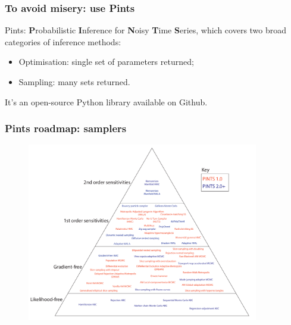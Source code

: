 \documentclass[handout]{beamer}
\begin{document}
\begin{frame}
\frametitle{To avoid misery: use Pints}

Pints: \textbf{P}robabilistic \textbf{I}nference for \textbf{N}oisy \textbf{T}ime \textbf{S}eries, which covers two broad categories of inference methods:

\begin{itemize}
	\item Optimisation: single set of parameters returned;
	\item Sampling: many sets returned.
\end{itemize}

It's an open-source Python library available on Github.

\end{frame}

\begin{frame}
\frametitle{Pints roadmap: samplers}

\begin{figure}
	\centerline{\includegraphics[width=0.9\textwidth]{./Figures/pints-roadmap-triangle-more-samplers.pdf}}
\end{figure}

\end{frame}





	 
\end{document}
